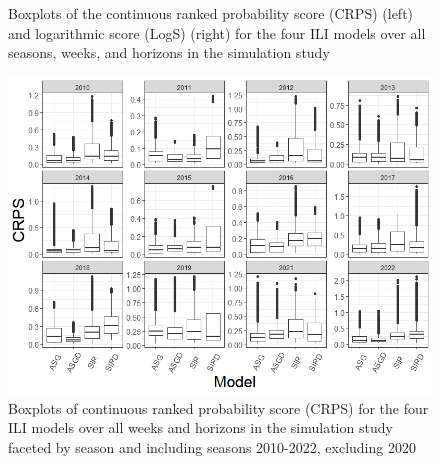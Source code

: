 \documentclass{article}
\begin{document}
\begin{figure}[hbt!]
\caption{Boxplots of the continuous ranked probability score (CRPS) (left) and logarithmic score (LogS) (right) for the four ILI models over all seasons, weeks, and horizons in the simulation study}
\label{fig:overall_scores}
\end{figure}



\begin{figure}[hbt!]
    \centering
    \includegraphics[scale=.5]{Images/crps_by_season.png}
    \caption{Boxplots of continuous ranked probability score (CRPS) for the four ILI models over all weeks and horizons in the simulation study faceted by season and including seasons 2010-2022, excluding 2020}
    \label{fig:crps_by_season}
\end{figure}
\end{document}
